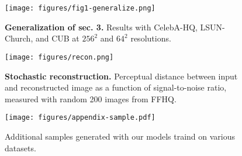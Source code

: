 \begin{figure*}[t!]
  \centering
  \texttt{[image: figures/fig1-generalize.png]}

  \caption{\textbf{Generalization of sec. 3.} Results with CelebA-HQ, LSUN-Church, and CUB at $256^2$ and $64^2$ resolutions.}

  \label{fig:generalize}
\end{figure*}


\begin{figure}[t!]
  \centering
  \texttt{[image: figures/recon.png]}
  \caption{\textbf{Stochastic reconstruction.} Perceptual distance between input and reconstructed image as a function of signal-to-noise ratio, measured with random 200 images from FFHQ.}
  \label{fig:recon_appendix}
\end{figure}

\begin{figure*}[t!]
  \centering
  \texttt{[image: figures/appendix-sample.pdf]}
  \caption{Additional samples generated with our models traind on various datasets.}
  \label{fig:sample_appendix}
\end{figure*}


\newpage



